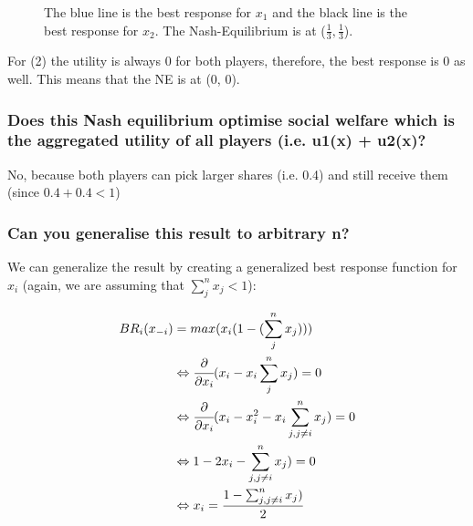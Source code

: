 \begin{figure}[H]
        \centering
        \caption{The blue line is the best response for $x_1$ and the black line is the best response for $x_2$. The Nash-Equilibrium is at ($\frac{1}{3}, \frac{1}{3}$).}
        \label{fig:2_4_1}
    \end{figure}

For (2) the utility is always $0$ for both players, therefore, the best response is 0 as well. This means that the NE is at (0, 0).

\subsubsection{Does this Nash equilibrium optimise social welfare which is the aggregated utility of all players (i.e. u1(x) + u2(x)?}

No, because both players can pick larger shares (i.e. 0.4) and still receive them (since $0.4 + 0.4 < 1$)

\subsubsection{Can you generalise this result to arbitrary n?}
We can generalize the result by creating a generalized best response function for $x_i$ (again, we are assuming that $\sum_{j}^{n} x_j < 1$):

\begin{equation}
    \begin{split}
        BR_i(x_{-i})&=max(x_i(1 - (\sum_{j}^{n} x_j)))\\
        &\Leftrightarrow \cfrac{\partial}{\partial x_i}(x_i - x_i \sum_{j}^{n} x_j)=0\\
        &\Leftrightarrow \cfrac{\partial}{\partial x_i}(x_i - x_i^2 - x_i \sum_{j,j\neq i}^{n} x_j)=0\\
        &\Leftrightarrow 1-2x_i - \sum_{j,j\neq i}^{n} x_j)=0\\
        &\Leftrightarrow x_i = \frac{1-\sum_{j,j\neq i}^{n} x_j)}{2}\\
    \end{split}
\end{equation}
